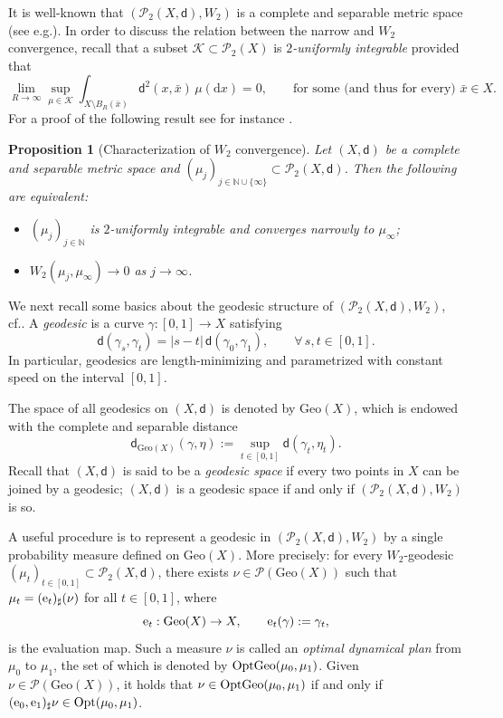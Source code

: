 \documentclass[11pt,a4paper]{article}
\theoremstyle{plain}
\newtheorem{proposition}[theorem]{Proposition}
\theoremstyle{definition}
\theoremstyle{remark}
\numberwithin{equation}{section}
\newcommand{\N}{\mathbb{N}} %
\newcommand{\Geo}{\mathrm{Geo}}
\newcommand{\OptGeo}{{\rm OptGeo}}
\newcommand{\Opt}{{\rm Opt}}
\newcommand{\cK}{\mathcal{K}}
\newcommand{\mui}{\mu_\infty}
\newcommand{\Prob}{\mathcal{P}}
\newcommand{\di}{\mathrm{d}}
\newcommand{\ee}{{\rm e}}
\newcommand{\sfd}{\mathsf d}
\begin{document}
It is well-known that $(\Prob_{2}(X,\sfd), W_{2})$ is a complete and separable metric space (see e.g.\@ \cite{Vil}). 
In order to discuss the relation between the narrow and $W_{2}$ convergence, recall that a subset $\cK\subset \Prob_{2}(X)$ is \emph{$2$-uniformly integrable} provided that
\[
\lim_{R\to \infty }\sup_{\mu\in \cK} \int_{X\setminus B_{R}(\bar{x})} \sfd^{2}(x,\bar{x}) \, \mu(\di x)=0 , \qquad \text{for some (and thus for every) } \bar{x}\in X.
\]
For a proof of the following result see for instance  \cite[Thm. 6.8]{Vil}.
\begin{proposition}[Characterization of $W_{2}$ convergence]\label{prop:W2convNarrow}
Let $(X,\sfd)$ be a complete and separable metric space and $(\mu_{j})_{j\in \N\cup\{\infty\}}\subset \Prob_{2}(X,\sfd)$.  Then the following are equivalent:
\begin{itemize}
\item $(\mu_{j})_{j\in \N}$ is $2$-uniformly integrable and converges narrowly to $\mui$;
\item $W_{2}(\mu_{j}, \mui)\to 0$ as $j\to \infty$.
\end{itemize}
\end{proposition}

We next recall some basics about the geodesic structure of  $(\Prob_{2}(X,\sfd), W_{2})$, cf.\@ \cite{Vil}. A \emph{geodesic} is a curve $\gamma:[0,1]\to X$ satisfying 
\begin{equation}
\sfd(\gamma_{s}, \gamma_{t})= |s-t| \,  \sfd(\gamma_{0}, \gamma_{1}), \qquad \forall\, s,t\in [0,1].
\end{equation}
In particular, geodesics are length-minimizing and parametrized with constant speed on the interval $[0,1]$.

The space of all geodesics on $(X,\sfd)$ is denoted by $\Geo(X)$, which is endowed with the complete and separable distance 
\begin{equation}
\sfd_{\Geo(X)}(\gamma, \eta):=\sup_{t\in [0,1]}\sfd(\gamma_{t}, \eta_{t}).
\end{equation}
Recall that $(X,\sfd)$ is said to be a \emph{geodesic space} if every two points in $X$ can be joined by a geodesic;  $(X,\sfd)$ is a geodesic space if and only if $(\Prob_{2}(X,\sfd), W_{2})$ is so.  

A useful procedure is to represent a geodesic in $(\Prob_{2}(X,\sfd), W_{2})$ by a single probability measure defined on $\Geo(X)$. More precisely: for every $W_{2}$-geodesic $(\mu_{t})_{t\in[0,1]}\subset \Prob_{2}(X,\sfd)$, there exists  $\nu\in \Prob(\Geo(X))$ such that $\mu_{t}=(\ee_{t})_{\sharp}(\nu)$ for all $t\in [0,1]$, where 
\begin{equation}
\ee_{t}:\Geo(X)\to X, \qquad \ee_{t}(\gamma):=\gamma_{t},
\end{equation}
is the evaluation map. Such a measure $\nu$ is called an \emph{optimal dynamical plan} from $\mu_{0}$ to $\mu_{1}$, the set of which is denoted by $\OptGeo(\mu_{0}, \mu_{1})$.
Given $\nu\in \Prob(\Geo(X))$, it holds that $\nu\in \OptGeo(\mu_{0},\mu_{1})$ if and only if $(\ee_{0}, \ee_{1})_{\sharp}\nu\in \Opt(\mu_{0}, \mu_{1})$.
\end{document}
